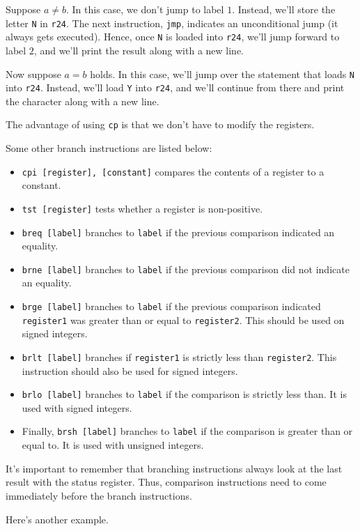 Suppose $a \neq b$. In this case, we don't jump to label $1$. Instead, we'll store the letter \verb!N! in \verb!r24!. The next instruction, \verb!jmp!, indicates an unconditional jump (it always gets executed). Hence, once \verb!N! is loaded into \verb!r24!, we'll jump forward to label $2$, and we'll print the result along with a new line.


Now suppose $a = b$ holds. In this case, we'll jump over the statement that loads \verb!N! into \verb!r24!. Instead, we'll load \verb!Y! into \verb!r24!, and we'll continue from there and print the character along with a new line.


The advantage of using \verb!cp! is that we don't have to modify the registers.

Some other branch instructions are listed below: \begin{itemize}
    \item \verb!cpi [register], [constant]! compares the contents of a register to a constant.
    \item \verb!tst [register]! tests whether a register is non-positive.
    \item \verb!breq [label]! branches to \verb!label! if the previous comparison indicated an equality.
    \item \verb!brne [label]! branches to \verb!label! if the previous comparison did not indicate an equality.
    \item \verb!brge [label]! branches to \verb!label! if the previous comparison indicated \verb!register1! was greater than or equal to \verb!register2!. This should be used on signed integers.
    \item \verb!brlt [label]! branches if \verb!register1! is strictly less than \verb!register2!. This instruction should also be used for signed integers.
    \item \verb!brlo [label]! branches to \verb!label! if the comparison is strictly less than. It is used with signed integers.
    \item Finally, \verb!brsh [label]! branches to \verb!label! if the comparison is greater than or equal to. It is used with unsigned integers.
\end{itemize}

It's important to remember that branching instructions always look at the last result with the status register. Thus, comparison instructions need to come immediately before the branch instructions.


Here's another example.

